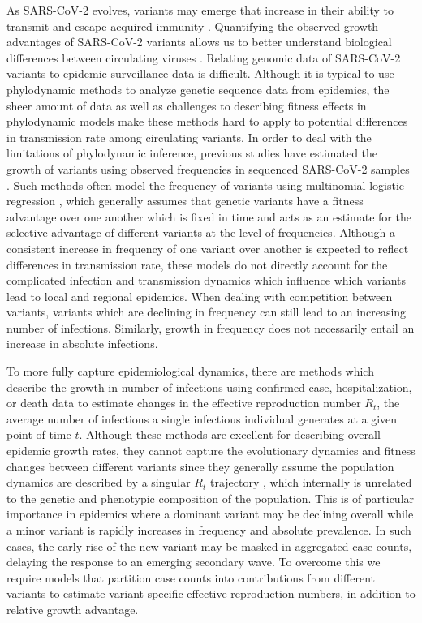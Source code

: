 \documentclass[11pt,oneside,letterpaper]{article}
\begin{document}
As SARS-CoV-2 evolves, variants may emerge that increase in their ability to transmit and escape acquired immunity \cite{tao2021biological}.
Quantifying the observed growth advantages of SARS-CoV-2 variants allows us to better understand biological differences between circulating viruses \cite{tegally2021detection, davies2021estimated}.
Relating genomic data of SARS-CoV-2 variants to epidemic surveillance data is difficult.
Although it is typical to use phylodynamic methods to analyze genetic sequence data from epidemics, the sheer amount of data as well as challenges to describing fitness effects in phylodynamic models make these methods hard to apply to potential differences in transmission rate among circulating variants.
In order to deal with the limitations of phylodynamic inference, previous studies have estimated the growth of variants using observed frequencies in sequenced SARS-CoV-2 samples \cite{Annavajhala2021, Faria2021, Obermeyer2021, Ito2021}.
Such methods often model the frequency of variants using multinomial logistic regression \cite{Annavajhala2021, Obermeyer2021}, which generally assumes that genetic variants have a fitness advantage over one another which is fixed in time and acts as an estimate for the selective advantage of different variants at the level of frequencies.
Although a consistent increase in frequency of one variant over another is expected to reflect differences in transmission rate, these models do not directly account for the complicated infection and transmission dynamics which influence which variants lead to local and regional epidemics.
When dealing with competition between variants, variants which are declining in frequency can still lead to an increasing number of infections.
Similarly, growth in frequency does not necessarily entail an increase in absolute infections.

To more fully capture epidemiological dynamics, there are methods which describe the growth in number of infections using confirmed case, hospitalization, or death data to estimate changes in the effective reproduction number $R_{t}$, the average number of infections a single infectious individual generates at a given point of time $t$.
Although these methods are excellent for describing overall epidemic growth rates, they cannot capture the evolutionary dynamics and fitness changes between different variants since they generally assume the population dynamics are described by a singular $R_{t}$ trajectory \cite{Cori2013, Abbott2020}, which internally is unrelated to the genetic and phenotypic composition of the population.
This is of particular importance in epidemics where a dominant variant may be declining overall while a minor variant is rapidly increases in frequency and absolute prevalence.
In such cases, the early rise of the new variant may be masked in aggregated case counts, delaying the response to an emerging secondary wave.
To overcome this we require models that partition case counts into contributions from different variants to estimate variant-specific effective reproduction numbers, in addition to relative growth advantage.
\end{document}
